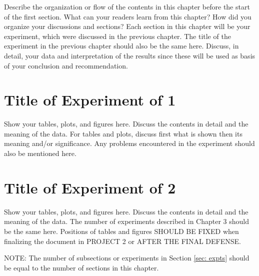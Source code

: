Describe the organization or flow of the contents in this chapter before the start of the first section.
What can your readers learn from this chapter?
How did you organize your discussions and sections?
Each section in this chapter will be your experiment, which were discussed in the previous chapter.
The title of the experiment in the previous chapter should also be the same here.
Discuss, in detail, your data and interpretation of the results since these will be used as basis of your conclusion and recommendation.

\section{Title of Experiment of 1}
Show your tables, plots, and figures here.
Discuss the contents in detail and the meaning of the data.
For tables and plots, discuss first what is shown then its meaning and/or significance.
Any problems encountered in the experiment should also be mentioned here.

\section{Title of Experiment of 2}
Show your tables, plots, and figures here.
Discuss the contents in detail and the meaning of the data.
The number of experiments described in Chapter 3 should be the same here.
Positions of tables and figures SHOULD BE FIXED when finalizing the document in PROJECT 2 or AFTER THE FINAL DEFENSE.

NOTE: The number of subsections or experiments in Section \ref{sec: expts} should be equal to the number of sections in this chapter.